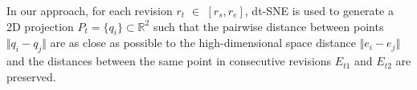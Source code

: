 In our approach, for each revision $r_{t}$ $\in$ $[r_{s}, r_{e}]$, dt-SNE is used to generate a 2D projection $P_{t} = \{q_{i} \} \subset{\mathbb{R}^{2}}$ such that the pairwise distance between points $\Vert q_{i} - q_{j} \Vert$ are as close as possible to the high-dimensional space distance $\Vert e_{i} - e_{j} \Vert$ and the distances between the same point in consecutive revisions $E_{t1}$ and $E_{t2}$ are preserved.
